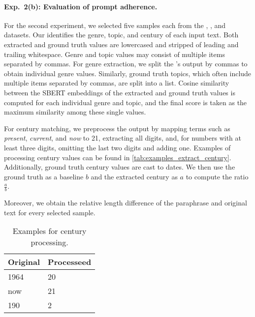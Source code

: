\paragraph{Exp.\ 2(b): Evaluation of prompt adherence.}
For the second experiment, we selected five samples each from the \dataBlog{}, \dataGutenberg{}, and \dataStudent{} datasets. 
Our \pextractor{} identifies the genre, topic, and century of each input text. 
Both extracted and ground truth values are lowercased and stripped of leading and trailing whitespace. 
Genre and topic values may consist of multiple items separated by commas. 
For genre extraction, we split the \pextractor{}'s output by commas to obtain individual genre values. 
Similarly, ground truth topics, which often include multiple items separated by commas, are split into a list. 
Cosine similarity between the SBERT embeddings of the extracted and ground truth values is computed for each individual genre and topic, and the final score is taken as the maximum similarity among these single values. 

For century matching, we preprocess the \pextractor{} output by mapping terms such as \textit{present}, \textit{current}, and \textit{now} to 21, extracting all digits, and, for numbers with at least three digits, omitting the last two digits and adding one. 
Examples of processing century values can be found in \autoref{tab:examples_extract_century}. 
Additionally, ground truth century values are cast to dates. 
We then use the ground truth as a baseline $b$ and the extracted century as $a$ to compute the ratio $\frac{a}{b}$.

Moreover, we obtain the relative length difference of the paraphrase and original text for every selected sample. 

\begin{table}[h]
\centering
\caption{Examples for century processing.}
\label{tab:examples_extract_century}
\begin{tabular}{ll}
    \toprule
\textbf{Original} & \textbf{Processeed} \\
\midrule
1964              & 20                  \\
now               & 21                  \\
190               & 2     \\
\bottomrule             
\end{tabular}%
\end{table}

